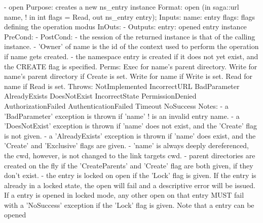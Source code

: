 \begin{myspec}
 
    - open
      Purpose:  creates a new ns_entry instance
      Format:   open               (in  saga::url name,
!                                   in  int       flags = Read,
                                    out ns_entry  entry);
      Inputs:   name:               entry
                flags:              flags defining the operation
                                    modus
      InOuts:   -
      Outputs:  entry:              opened entry instance
      PreCond:  -
      PostCond: - the session of the returned instance is that
                  of the calling instance.
                - 'Owner' of name is the id of the context
                  used to perform the operation if name gets
                  created.
                - the namespace entry is created if it does not 
                  yet exist, and the CREATE flag is specified.
      Perms:    Exec  for name's parent directory.
                Write for name's parent directory if Create is set.
                Write for name if Write is set.
                Read  for name if Read  is set.
      Throws:   NotImplemented
                IncorrectURL
                BadParameter
                AlreadyExists
                DoesNotExist
                IncorrectState
                PermissionDenied
                AuthorizationFailed
                AuthenticationFailed
                Timeout
                NoSuccess
      Notes:    - a 'BadParameter' exception is thrown if 'name'
!                 is an invalid entry name.
                - a 'DoesNotExist' exception is thrown if 'name'
                  does not exist, and the 'Create' flag is not
                  given.
                - a 'AlreadyExists' exception is thrown if 'name'
                  does exist, and the 'Create' and 'Exclusive' 
                  flags are given.
                - 'name' is always deeply dereferenced, the cwd,
                  however, is not changed to the link targets
                  cwd.
                - parent directories are created on the fly if
                  the 'CreateParents' and 'Create' flag are both
                  given, if they don't exist.
                - the entry is locked on open if the 'Lock' flag
                  is given.  If the entry is already in a locked
                  state, the open will fail and a descriptive
                  error will be issued.  If a entry is opened in
                  locked mode, any other open on that entry MUST
                  fail with a 'NoSuccess' exception if the 'Lock'
                  flag is given.  Note that a entry can be opened

\end{myspec}
